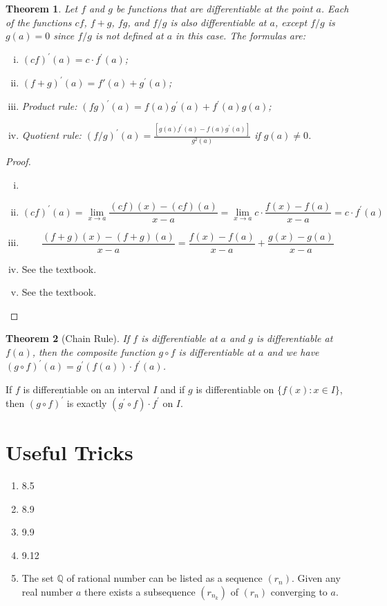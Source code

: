 \documentclass[12pt, lettersize]{book}
\newtheorem{thm}{Theorem}[section]
\begin{document}
			\begin{thm}\label{def:28.3}
			Let $f$ and $g$ be functions that are differentiable at the point $a$. Each of the functions $cf$, $f+g$, $fg$, and $f/g$ is also differentiable at $a$, except $f/g$ is $g(a)=0$ since $f/g$ is not defined at $a$ in this case.
			The formulas are:
			\begin{enumerate}[(i)]
				\item $(cf)^\prime(a)=c\cdot f^\prime(a)$;
				\item $(f+g)^\prime(a)=f\prime(a)+g^\prime(a)$;
				\item Product rule: $(fg)^\prime(a)=f(a)g^\prime(a)+f^\prime(a)g(a)$;
				\item Quotient rule: $(f/g)^\prime(a)=\frac{[g(a)f^\prime(a)-f(a)g^\prime(a)]}{g^2(a)}$ if $g(a)\neq0$.
			\end{enumerate}
			\end{thm}
			\begin{proof}
			\begin{enumerate}[(i)]
				\item[]
				\item
				\begin{displaymath}
					(cf)^\prime(a)=\lim_{x\rightarrow a}\frac{(cf)(x)-(cf)(a)}{x-a}=\lim_{x\rightarrow a}c\cdot\frac{f(x)-f(a)}{x-a}=c\cdot f^\prime(a)
				\end{displaymath} 
				\item
				\begin{displaymath}
					\frac{(f+g)(x)-(f+g)(a)}{x-a}=\frac{f(x)-f(a)}{x-a}+\frac{g(x)-g(a)}{x-a}
				\end{displaymath}
				\item See the textbook.
				\item See the textbook.
			\end{enumerate}
			\end{proof}
			
			\begin{thm}[Chain Rule]\label{def:28.4}
			If $f$ is differentiable at $a$ and $g$ is differentiable at $f(a)$, then the composite function $g\circ f$ is differentiable at $a$ and we have $(g\circ f)^\prime(a)=g^\prime(f(a))\cdot f^\prime(a)$.
			\end{thm}
			If $f$ is differentiable on an interval $I$ and if $g$ is differentiable on $\{f(x): x\in I\}$, then $(g\circ f)^\prime$ is exactly $(g^\prime\circ f)\cdot f^\prime$ on $I$.
			
	\chapter{Useful Tricks}
	\begin{enumerate}
		\item 8.5
		\item 8.9
		\item 9.9
		\item 9.12
		\item The set $\mathbb{Q}$ of rational number can be listed as a sequence $(r_n)$. Given any real number $a$ there exists a subsequence $(r_{n_k})$ of $(r_n)$ converging to $a$.
  	\end{enumerate}
		
\end{document}
